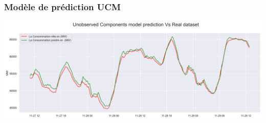 \begin{frame}
\frametitle{Modèle de prédiction UCM}
\includegraphics[scale=0.30]{images/outputVV.png}

\end{frame}
